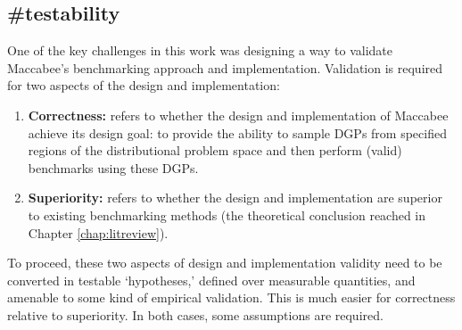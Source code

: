 \documentclass[./main.tex]{subfiles}
\begin{document}

\subsection*{\textbf{\#testability}}
\label{hc:testability}

One of the key challenges in this work was designing a way to validate Maccabee's benchmarking approach and implementation. Validation is required for two aspects of the design and implementation:

\begin{enumerate}
    \item \textbf{Correctness:} refers to whether the design and implementation of Maccabee achieve its design goal: to provide the ability to sample DGPs from specified regions of the distributional problem space and then perform (valid) benchmarks using these DGPs.
    
    \item \textbf{Superiority:} refers to whether the design and implementation are superior to existing benchmarking methods (the theoretical conclusion reached in Chapter \ref{chap:litreview}).
\end{enumerate}

To proceed, these two aspects of design and implementation validity need to be converted in testable `hypotheses,' defined over measurable quantities, and amenable to some kind of empirical validation. This is much easier for correctness relative to superiority. In both cases, some assumptions are required.
\end{document}
